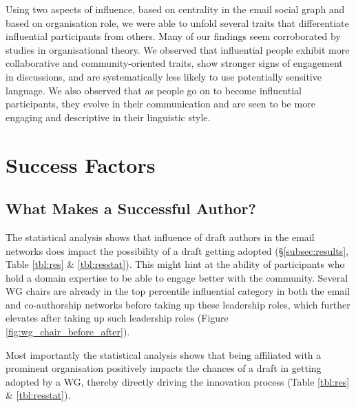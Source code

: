 \documentclass[twocolumn,10pt]{article}
\newcommand{\pb}[1]{\vspace{0.75ex}\noindent{\textbf{#1}}}
\begin{document}
\pb{Summary:}
Using two aspects of influence, based on centrality in the email social
graph and based on organisation role, we were able to unfold several
traits that differentiate influential participants from others. Many
of our findings seem corroborated by studies in organisational theory.
We observed that influential people exhibit more collaborative and
community-oriented traits, show stronger signs of engagement in
discussions, and are systematically less likely to use potentially
sensitive language.
We also observed that as people go on to become influential participants,
they evolve in their communication and are seen to be more engaging and
descriptive in their linguistic style. 


\section{Success Factors}
\label{sec:success-factors}

\subsection{What Makes a Successful Author?}


The statistical analysis shows that influence of draft authors in the email
networks does impact the possibility of a draft getting adopted
(\S\ref{subsec:results}, Table \ref{tbl:res} \& \ref{tbl:resstat}). This
might hint at the ability of participants who hold a domain expertise to be
able to engage better with the community. Several WG chairs are already in
the top percentile influential category in both the email and co-authorship
networks before taking up these leadership roles, which further elevates
after taking up such leadership roles (Figure
\ref{fig:wg_chair_before_after}).

Most importantly the statistical analysis shows that being affiliated with
a prominent organisation positively impacts the chances of a draft in
getting adopted by a WG, thereby directly driving the innovation process
(Table \ref{tbl:res} \& \ref{tbl:resstat}).
\end{document}
